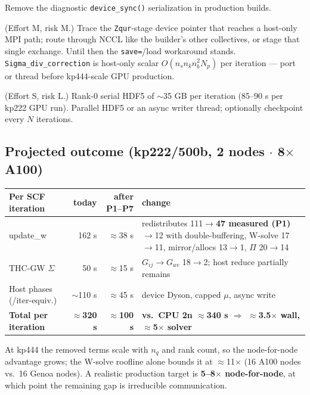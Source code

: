 \documentclass[11pt]{article}
\begin{document}
\begin{description}[leftmargin=1.6em,style=nextline]
Remove the diagnostic \texttt{device\_sync()} serialization in production builds.
\item[P8 --- Fix the device ISDF builder $\geq$16 ranks (B3); $\Sigma$ divergence correction.] (Effort M, risk M.)
Trace the \texttt{Zqur}-stage device pointer that reaches a host-only MPI path; route
through NCCL like the builder's other collectives, or stage that single exchange. Until
then the \texttt{save=}/load workaround stands. \texttt{Sigma\_div\_correction} is
host-only scalar $O(n_s n_k n_b^2 N_p)$ per iteration --- port or thread before
kp444-scale GPU production.
\item[P9 --- Write path. \textcolor{good}{$-$20--30 s/iter-equiv.}] (Effort S, risk L.)
Rank-0 serial HDF5 of $\sim$35 GB per iteration (85--90 s per kp222 GPU run). Parallel
HDF5 or an async writer thread; optionally checkpoint every $N$ iterations.
\end{description}

\subsection{Projected outcome (kp222/500b, 2 nodes $\cdot$ 8$\times$A100)}
\begin{table}[H]\footnotesize
\begin{tabularx}{\textwidth}{@{}lrrX@{}}
\toprule
Per SCF iteration & today & after P1--P7 & change \\
\midrule
update\_w & 162 s & $\approx$38 s & redistributes 111$\to$\textbf{47 measured (P1)}$\to$12 with double-buffering, W-solve 17$\to$11, mirror/allocs 13$\to$1, $\Pi$ 20$\to$14 \\
THC-GW $\Sigma$ & 50 s & $\approx$15 s & $G_{ij}{\rightarrow}G_{uv}$ 18$\to$2; host reduce partially remains \\
Host phases (/iter-equiv.) & $\sim$110 s & $\approx$45 s & device Dyson, capped $\mu$, async write \\
\midrule
\textbf{Total per iteration} & \textbf{$\approx$320 s} & \textbf{$\approx$100 s} &
\textbf{vs.\ CPU 2n $\approx$340 s $\Rightarrow$ $\approx$3.5$\times$ wall, $\approx$5$\times$ solver} \\
\bottomrule
\end{tabularx}
\end{table}

\noindent At kp444 the removed terms scale with $n_q$ and rank count, so the
node-for-node advantage grows; the W-solve roofline alone bounds it at $\approx$11$\times$
(16 A100 nodes vs.\ 16 Genoa nodes). A realistic production target is
\textbf{5--8$\times$ node-for-node}, at which point the remaining gap is irreducible
communication.
\end{document}
